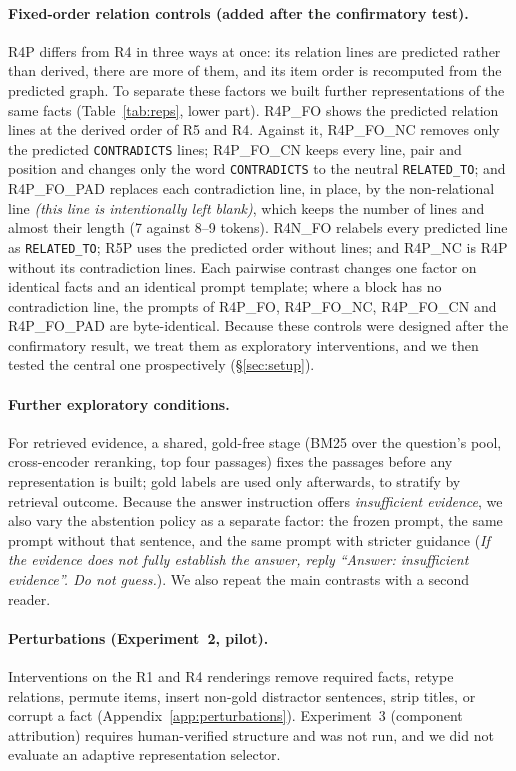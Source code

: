 \paragraph{Fixed-order relation controls (added after the confirmatory test).}
R4P differs from R4 in three ways at once: its relation lines are predicted rather than derived, there are more of them, and its item order is recomputed from the predicted graph. To separate these factors we built further representations of the same facts (Table~\ref{tab:reps}, lower part). R4P\_FO shows the predicted relation lines at the derived order of R5 and R4. Against it, R4P\_FO\_NC removes only the predicted \texttt{CONTRADICTS} lines; R4P\_FO\_CN keeps every line, pair and position and changes only the word \texttt{CONTRADICTS} to the neutral \texttt{RELATED\_TO}; and R4P\_FO\_PAD replaces each contradiction line, in place, by the non-relational line \emph{(this line is intentionally left blank)}, which keeps the number of lines and almost their length (7 against 8--9 tokens). R4N\_FO relabels every predicted line as \texttt{RELATED\_TO}; R5P uses the predicted order without lines; and R4P\_NC is R4P without its contradiction lines. Each pairwise contrast changes one factor on identical facts and an identical prompt template; where a block has no contradiction line, the prompts of R4P\_FO, R4P\_FO\_NC, R4P\_FO\_CN and R4P\_FO\_PAD are byte-identical. Because these controls were designed after the confirmatory result, we treat them as exploratory interventions, and we then tested the central one prospectively (\S\ref{sec:setup}).

\paragraph{Further exploratory conditions.}
For retrieved evidence, a shared, gold-free stage (BM25 over the question's pool, cross-encoder reranking, top four passages) fixes the passages before any representation is built; gold labels are used only afterwards, to stratify by retrieval outcome. Because the answer instruction offers \emph{insufficient evidence}, we also vary the abstention policy as a separate factor: the frozen prompt, the same prompt without that sentence, and the same prompt with stricter guidance (\emph{If the evidence does not fully establish the answer, reply ``Answer: insufficient evidence''. Do not guess.}). We also repeat the main contrasts with a second reader.

\paragraph{Perturbations (Experiment~2, pilot).}
Interventions on the R1 and R4 renderings remove required facts, retype relations, permute items, insert non-gold distractor sentences, strip titles, or corrupt a fact (Appendix~\ref{app:perturbations}). Experiment~3 (component attribution) requires human-verified structure and was not run, and we did not evaluate an adaptive representation selector.
